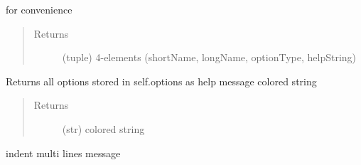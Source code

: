 \documentclass[a4paper,10pt,english]{sphinxmanual}
\begin{document}
\begin{fulllineitems}
\begin{fulllineitems}
\end{fulllineitems}


\begin{fulllineitems}
\label{\detokenize{apidoc_src/src:src.options.Options.debug_write}}
\end{fulllineitems}


\begin{fulllineitems}
\label{\detokenize{apidoc_src/src:src.options.Options.getDetailOption}}
for convenience
\begin{quote}\begin{description}
\item[{Returns}] \leavevmode
(tuple) 4-elements (shortName, longName, optionType, helpString)

\end{description}\end{quote}

\end{fulllineitems}


\begin{fulllineitems}
\label{\detokenize{apidoc_src/src:src.options.Options.get_help}}
Returns all options stored in self.options 
as help message colored string
\begin{quote}\begin{description}
\item[{Returns}] \leavevmode
(str) colored string

\end{description}\end{quote}

\end{fulllineitems}


\begin{fulllineitems}
\label{\detokenize{apidoc_src/src:src.options.Options.indent}}
indent multi lines message


\end{fulllineitems}
\end{fulllineitems}
\end{document}
